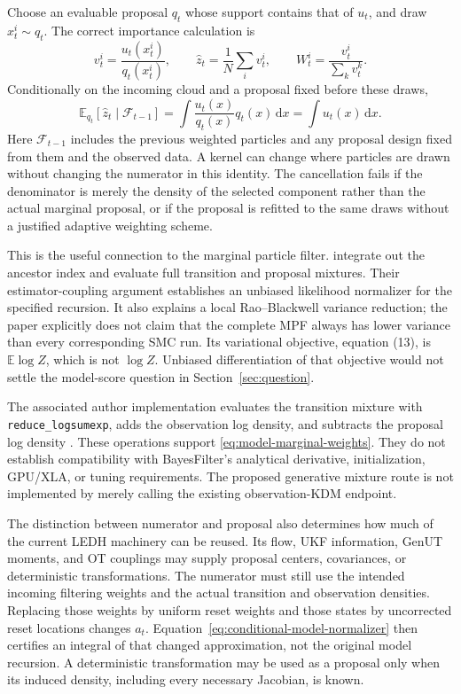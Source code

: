 \documentclass[11pt]{article}
\newcommand{\dd}{\mathrm{d}}
\begin{document}
Choose an evaluable proposal $q_t$ whose support contains that of $u_t$, and
draw $x_t^i\sim q_t$. The correct importance calculation is
\begin{equation}
 v_t^i=\frac{u_t(x_t^i)}{q_t(x_t^i)},\qquad
 \widehat z_t=\frac1N\sum_i v_t^i,\qquad
 W_t^i=\frac{v_t^i}{\sum_k v_t^k}.
 \label{eq:model-marginal-weights}
\end{equation}
Conditionally on the incoming cloud and a proposal fixed before these draws,
\begin{equation}
 \mathbb E_{q_t}[\widehat z_t\mid\mathcal F_{t-1}]
 =\int \frac{u_t(x)}{q_t(x)}q_t(x)\,\dd x
 =\int u_t(x)\,\dd x.
 \label{eq:conditional-model-normalizer}
\end{equation}
Here $\mathcal F_{t-1}$ includes the previous weighted particles and any
proposal design fixed from them and the observed data. A kernel can change
where particles are drawn without changing the numerator in this identity.
The cancellation fails if the denominator is merely the density of the
selected component rather than the actual marginal proposal, or if the
proposal is refitted to the same draws without a justified adaptive weighting
scheme.

This is the useful connection to the marginal particle filter.
\citet[Algorithm 2, Theorem 2, equations (9)--(12)]{lai2022vmpf} integrate out
the ancestor index and evaluate full transition and proposal mixtures. Their
estimator-coupling argument establishes an unbiased likelihood normalizer for
the specified recursion. It also explains a local Rao--Blackwell variance
reduction; the paper explicitly does not claim that the complete MPF always
has lower variance than every corresponding SMC run. Its variational
objective, equation (13), is $\mathbb E\log\widehat Z$, which is not
$\log Z$. Unbiased differentiation of that objective would not settle the
model-score question in Section~\ref{sec:question}.

The associated author implementation evaluates the transition mixture with
\texttt{reduce\_logsumexp}, adds the observation log density, and subtracts
the proposal log density \citep{laicode2022}. These operations support
\eqref{eq:model-marginal-weights}. They do not establish compatibility with
BayesFilter's analytical derivative, initialization, GPU/XLA, or tuning
requirements. The proposed generative mixture route is not implemented by
merely calling the existing observation-KDM endpoint.

The distinction between numerator and proposal also determines how much of
the current LEDH machinery can be reused. Its flow, UKF information, GenUT
moments, and OT couplings may supply proposal centers, covariances, or
deterministic transformations. The numerator must still use the intended
incoming filtering weights and the actual transition and observation
densities. Replacing those weights by uniform reset weights and those states
by uncorrected reset locations changes $a_t$. Equation~\eqref{eq:conditional-model-normalizer}
then certifies an integral of that changed approximation, not the original
model recursion. A deterministic transformation may be used as a proposal
only when its induced density, including every necessary Jacobian, is known.
\end{document}
